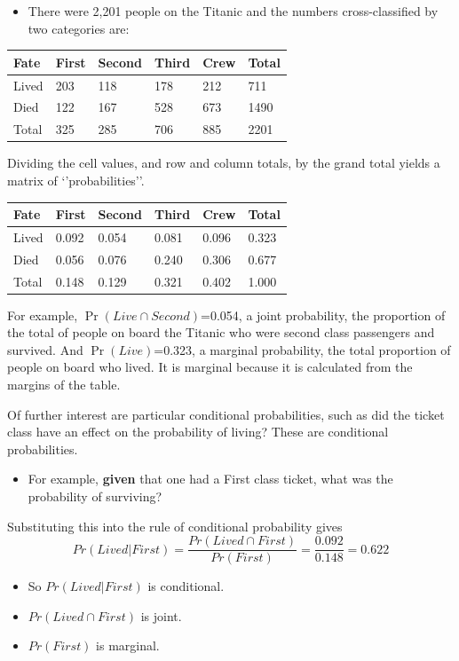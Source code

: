 \documentclass[
  oneside]{krantz}
\providecommand{\tightlist}{%
  \setlength{\itemsep}{0pt}\setlength{\parskip}{0pt}}
\begin{document}
\begin{itemize}
\tightlist
\item
  There were 2,201 people on the Titanic and the numbers cross-classified by two categories are:
\end{itemize}

\begin{longtable}[]{@{}llllll@{}}
\toprule
Fate & First & Second & Third & Crew & Total\tabularnewline
\midrule
\endhead
Lived & 203 & 118 & 178 & 212 & 711\tabularnewline
Died & 122 & 167 & 528 & 673 & 1490\tabularnewline
Total & 325 & 285 & 706 & 885 & 2201\tabularnewline
\bottomrule
\end{longtable}

Dividing the cell values, and row and column totals, by the grand total
yields a matrix of `'probabilities''.

\begin{longtable}[]{@{}llllll@{}}
\toprule
Fate & First & Second & Third & Crew & Total\tabularnewline
\midrule
\endhead
Lived & 0.092 & 0.054 & 0.081 & 0.096 & 0.323\tabularnewline
Died & 0.056 & 0.076 & 0.240 & 0.306 & 0.677\tabularnewline
Total & 0.148 & 0.129 & 0.321 & 0.402 & 1.000\tabularnewline
\bottomrule
\end{longtable}

For example, \(\Pr(Live \cap Second)\)=0.054, a joint probability, the proportion of the total of people on board the Titanic who were second class passengers and survived.
And \(\Pr(Live)\)=0.323, a marginal probability, the total proportion of people on board who lived. It is marginal because it is calculated from the margins of the table.

Of further interest are particular conditional probabilities, such as
did the ticket class have an effect on the probability of living?
These are conditional probabilities.

\begin{itemize}
\tightlist
\item
  For example, \textbf{given} that one had a First class ticket, what was the probability of surviving?
\end{itemize}

Substituting this into the rule of conditional probability gives
\[Pr(Lived|First)  = \frac{Pr(Lived \cap First)} {Pr(First)} = \frac{0.092} {0.148} = 0.622\]

\begin{itemize}
\tightlist
\item
  So \(Pr(Lived|First)\) is conditional.
\item
  \(Pr(Lived \cap First)\) is joint.
\item
  \(Pr(First)\) is marginal.
\end{itemize}
\end{document}
